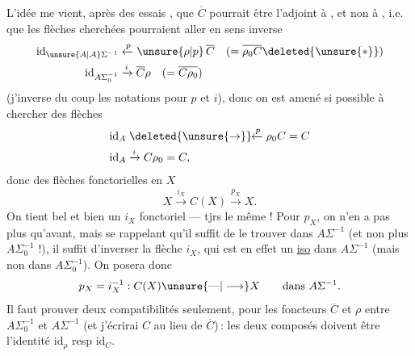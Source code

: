L'idée me vient, après des essais , que $\overline C$ pourrait être l'adjoint à , et non à , i.e. que les flèches cherchées pourraient aller en sens inverse
\[
 \begin{aligned}
 \mathrm{id}_{\unsure{A|\mathcal A}\Sigma^{-1}}&\xleftarrow{p}\unsure{\rho|p}\,\overline C\quad(=\overline{\rho_0 C}\deleted{\unsure{*}})\\
 \mathrm{id}_{A\Sigma_0^{-1}}&\xrightarrow{i}\overline C\rho\quad(=\overline{C\rho_0})
 \end{aligned}
\]
(j'inverse du coup les notations pour $p$ et $i$), donc on est amené si possible à chercher des flèches
\[
 \begin{aligned}
 \mathrm{id}_A&\mathrel{\deleted{\unsure{\rightarrow}}\!\!\xleftarrow{p}}\rho_0 C=C\\
 \mathrm{id}_A&\xrightarrow{i}C\rho_0=C,
 \end{aligned}
\]
donc des flèches fonctorielles en $X$
\[
 X\xrightarrow{i_X}C(X)\xrightarrow{p_X}X.
\]
On tient bel et bien un  $i_X$ fonctoriel --- tjrs le même ! Pour $p_X$, on n'en a pas plus qu'avant, mais se rappelant qu'il suffit de le trouver dans $A\Sigma^{-1}$ (et non plus $A\Sigma_0^{-1}$ !), il suffit d'inverser la flèche $i_X$, qui est en effet un \uline{iso} dans $A\Sigma^{-1}$ (mais non dans $A\Sigma_0^{-1}$). On posera donc
\[
 p_X=i_X^{-1}:C(X)\unsure{\text{---}|\longrightarrow}X\qquad\text{dans }A\Sigma^{-1}.
\]
Il faut prouver deux compatibilités seulement, pour les foncteurs $\overline C$ et $\rho$ entre $A\Sigma_0^{-1}$ et $A\Sigma^{-1}$ (et j'écrirai $C$ au lieu de $\overline C$)\,: les deux composés
doivent être l'identité $\mathrm{id}_{\rho}$ resp $\mathrm{id}_C$.
